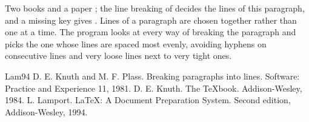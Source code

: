 \documentclass{article}
\begin{document}
Two books \cite{knuth84,lamport94} and a paper \cite{knuth81}; the line breaking of
\cite[section~2]{knuth81} decides the lines of this paragraph, and a missing key gives
\cite{nowhere}.
Lines of a paragraph are chosen together rather than one at a time. The program looks at every way of breaking the paragraph and picks the one whose lines are spaced most evenly, avoiding hyphens on consecutive lines and very loose lines next to very tight ones.
\begin{thebibliography}{Lam94}
 D. E. Knuth and M. F. Plass. Breaking paragraphs into lines. Software: Practice and Experience 11, 1981.
 D. E. Knuth. The TeXbook. Addison-Wesley, 1984.
 L. Lamport. LaTeX: A Document Preparation System. Second edition, Addison-Wesley, 1994.
\end{thebibliography}
\end{document}
